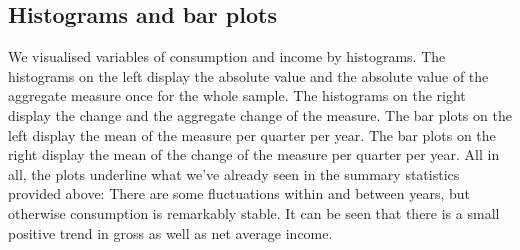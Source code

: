 \documentclass[12pt,a4paper]{article}
\begin{document}
\subsection*{Histograms and bar plots}

We visualised variables of consumption and income by histograms. The histograms on the left display the absolute value and the absolute value of the aggregate measure once for the whole sample. The histograms on the right display the change and the aggregate change of the measure. The bar plots on the left display the mean of the measure per quarter per year. The bar plots on the right display the mean of the change of the measure per quarter per year. All in all, the plots underline what we've already seen in the summary statistics provided above: There are some fluctuations within and between years, but otherwise consumption is remarkably stable. It can be seen that there is a small positive trend in gross as well as net average income.
\end{document}
